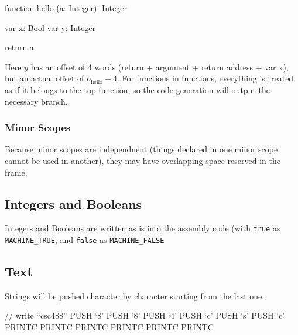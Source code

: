   \begin{code}
  function hello (a: Integer): Integer
  {
    var x: Bool
    var y: Integer
   
    return a
  }
  \end{code}

  Here $y$ has an offset of 4 words (return + argument + return address + var
  x), but an actual offset of $o_{\text{hello}} + 4$.
  For functions in functions, everything is treated as if it belongs to the top
  function, so the code generation will output the necessary branch.
\subsubsection{Minor Scopes}
  Because minor scopes are independnent (things declared in one minor scope
  cannot be used in another), they may have overlapping space reserved in the
  frame.
\subsection{Integers and Booleans}
  Integers and Booleans are written as is into the assembly code (with
  \texttt{true} as \texttt{MACHINE\_TRUE}, and \texttt{false} as
  \texttt{MACHINE\_FALSE}
\subsection{Text}
  Strings will be pushed character by character starting from the last one.
  \begin{code}[Text]
    // write ``csc488''
    PUSH `8'
    PUSH `8'
    PUSH `4'
    PUSH `c'
    PUSH `s'
    PUSH `c'
    PRINTC
    PRINTC
    PRINTC
    PRINTC
    PRINTC
    PRINTC
  \end{code}
